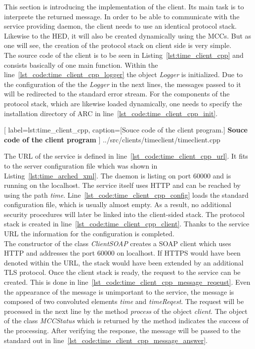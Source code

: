 This section is introducing the implementation of the client.
Its main task is to interprete the returned message.
In order to be able to communicate with the service providing daemon, the client needs to use an identical protocol stack.
Likewise to the HED, it will also be created dynamically using the MCCs.
But as one will see, the creation of the protocol stack on client side is very simple.\\

The source code of the client is to be seen in Listing~\ref{lst:time_client_cpp} and consists basically of one main function.
Within the line~\ref{lst_code:time_client_cpp_logger} the object \textit{Logger} is initialized.
Due to the configuration of the the \textit{Logger} in the next lines, the messages passed to it will be redirected to the standard error stream.  For the components of the protocol stack, which  are likewise loaded dynamically, one needs to specify the installation directory of ARC in line~\ref{lst_code:time_client_cpp_init}.\\

	[
	label=lst:time_client_cpp,
	caption={[Souce code of the client program.]
	\textbf{Souce code of the client program}}
	]
{../src/clients/timeclient/timeclient.cpp}
 

The URL of the service is defined in line~\ref{lst_code:time_client_cpp_url}.
It fits to the server configuration file which was shown in Listing~\ref{lst:time_arched_xml}.
The daemon is listing on port 60000 and is running on the localhost. The service itself uses HTTP and can be reached by using the path \textit{time}.
Line~\ref{lst_code:time_client_cpp_config} loads the standard configuration file, which is usually almost empty.
As a result, no additional security procedures will later be linked into the client-sided stack. 
The protocol stack is created in line~\ref{lst_code:time_client_cpp_client}. 
Thanks to the service URL the information for the configuration is completed.\\


The constructor of the class \textit{ClientSOAP} creates a SOAP client which uses HTTP and addresses the port 60000 on localhost.
If HTTPS would have been denoted within the URL, the stack would have been extended by an additional TLS protocol.
Once the client stack is ready, the request to the service can be created.
This is done in line~\ref{lst_code:time_client_cpp_message_reqeust}.
Even the appearance of the message is unimportant to the service, the message is composed of two convoluted elements \textit{time} and \textit{timeReqest}. 
The request will be processed in the next line by the method \textit{process} of the object \textit{client}. %
The object of the class \textit{MCCStatus} which is returned by the method indicates the success of the processing.
After verifying the response, the message will be passed to the standard out in line~\ref{lst_code:time_client_cpp_message_answer}. \\


